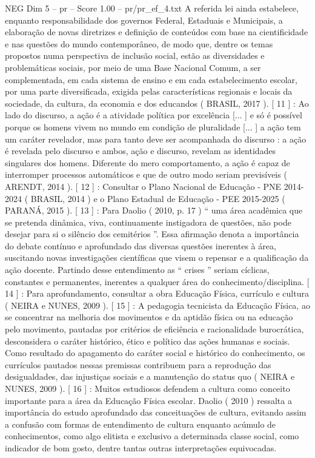 \begin{textsample}{NEG Dim 5 – pr – Score 1.00 – pr/pr\_ef\_4.txt}
A referida lei ainda estabelece, enquanto responsabilidade dos governos Federal, Estaduais e Municipais, a elaboração de novas diretrizes e definição de conteúdos com base na cientificidade e nas questões do mundo contemporâneo, de modo que, dentre os temas propostos numa perspectiva de inclusão social, estão as diversidades e problemáticas sociais, por meio de uma Base Nacional Comum, a ser complementada, em cada sistema de ensino e em cada estabelecimento escolar, por uma parte diversificada, exigida pelas características regionais e locais da sociedade, da cultura, da economia e dos educandos ( BRASIL, 2017 ). [ 11 ] : Ao lado do discurso, a ação é a atividade política por excelência [... ] e só é possível porque os homens vivem no mundo em condição de pluralidade [... ] a ação tem um caráter revelador, mas para tanto deve ser acompanhada do discurso : a ação é revelada pelo discurso e ambos, ação e discurso, revelam as identidades singulares dos homens.
Diferente do mero comportamento, a ação é capaz de interromper processos automáticos e que de outro modo seriam previsíveis ( ARENDT, 2014 ). [ 12 ] : Consultar o Plano Nacional de Educação - PNE 2014-2024 ( BRASIL, 2014 ) e o Plano Estadual de Educação - PEE 2015-2025 ( PARANÁ, 2015 ). [ 13 ] : Para Daolio ( 2010, p. 17 ) “ uma área acadêmica que se pretenda dinâmica, viva, continuamente instigadora de questões, não pode desejar para si o silêncio dos cemitérios ”.
Essa afirmação denota a importância do debate contínuo e aprofundado das diversas questões inerentes à área, suscitando novas investigações científicas que visem o repensar e a qualificação da ação docente.
Partindo desse entendimento as “ crises ” seriam cíclicas, constantes e permanentes, inerentes a qualquer área do conhecimento/disciplina. [ 14 ] : Para aprofundamento, consultar a obra Educação Física, currículo e cultura ( NEIRA e NUNES, 2009 ). [ 15 ] : A pedagogia tecnicista da Educação Física, ao se concentrar na melhoria dos movimentos e da aptidão física ou na educação pelo movimento, pautadas por critérios de eficiência e racionalidade burocrática, desconsidera o caráter histórico, ético e político das ações humanas e sociais.
Como resultado do apagamento do caráter social e histórico do conhecimento, os currículos pautados nessas premissas contribuem para a reprodução das desigualdades, das injustiças sociais e a manutenção do status quo ( NEIRA e NUNES, 2009 ). [ 16 ] : Muitos estudiosos defendem a cultura como conceito importante para a área da Educação Física escolar.
Daolio ( 2010 ) ressalta a importância do estudo aprofundado das conceituações de cultura, evitando assim a confusão com formas de entendimento de cultura enquanto acúmulo de conhecimentos, como algo elitista e exclusivo a determinada classe social, como indicador de bom gosto, dentre tantas outras interpretações equivocadas.

\end{textsample}

